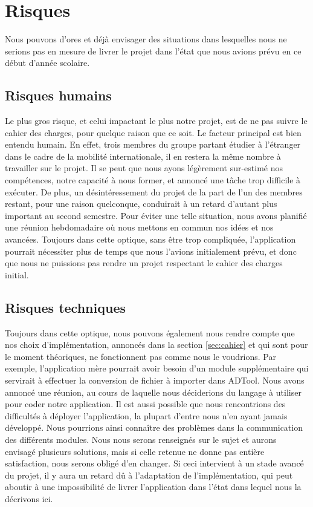 \section{Risques}
    Nous pouvons d'ores et déjà envisager des situations dans lesquelles nous ne serions pas en mesure de livrer le projet dans l'état que nous avions prévu en ce début d'année scolaire.

    \subsection{Risques humains}
		Le plus gros risque, et celui impactant le plus notre projet, est de ne pas suivre le cahier des charges, pour quelque raison que ce soit.
	    Le facteur principal est bien entendu humain. En effet, trois membres du groupe partant étudier à l'étranger dans le cadre de la mobilité internationale, il en restera la même nombre à travailler sur le projet. Il se peut que nous ayons légèrement sur-estimé nos compétences, notre capacité à nous former, et annoncé une tâche trop difficile à exécuter. De plus, un désintéressement du projet de la part de l'un des membres restant, pour une raison quelconque, conduirait à un retard d'autant plus important au second semestre. Pour éviter une telle situation, nous avons planifié une réunion hebdomadaire où nous mettons en commun nos idées et nos avancées. Toujours dans cette optique, sans être trop compliquée, l'application pourrait nécessiter plus de temps que nous l'avions initialement prévu, et donc que nous ne puissions pas rendre un projet respectant le cahier des charges initial.

    \subsection{Risques techniques}
	    Toujours dans cette optique, nous pouvons également nous rendre compte que nos choix d'implémentation, annoncés dans la section \ref{sec:cahier} et qui sont pour le moment théoriques, ne fonctionnent pas comme nous le voudrions. Par exemple, l'application mère pourrait avoir besoin d'un module supplémentaire qui servirait à effectuer la conversion de fichier à importer dans ADTool. Nous avons annoncé une réunion, au cours de laquelle nous déciderions du langage à utiliser pour coder notre application.
	    Il est aussi possible que nous rencontrions des difficultés à déployer l'application, la plupart d'entre nous n'en ayant jamais développé. Nous pourrions ainsi connaître des problèmes dans la communication des différents modules. Nous nous serons renseignés sur le sujet et aurons envisagé plusieurs solutions, mais si celle retenue ne donne pas entière satisfaction, nous serons obligé d'en changer. Si ceci intervient à un stade avancé du projet, il y aura un retard dû à l'adaptation de l'implémentation, qui peut aboutir à une impossibilité de livrer l'application dans l'état dans lequel nous la décrivons ici.

